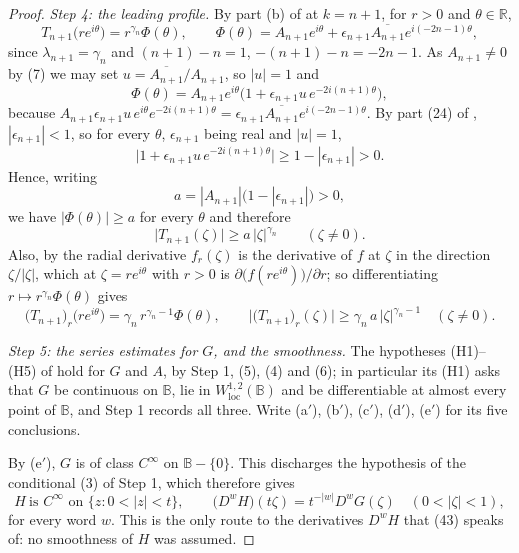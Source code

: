 \begin{proof}
\emph{Step 4: the leading profile.}  By part (b) of
 at $k=n+1$, for $r>0$ and $\theta\in\mathbb{R}$,
\[
  T_{n+1}\bigl(re^{i\theta}\bigr)=r^{\gamma_n}\Phi(\theta),\qquad
  \Phi(\theta)=A_{n+1}e^{i\theta}
    +\epsilon_{n+1}\overline{A_{n+1}}e^{i(-2n-1)\theta},
\]
since $\lambda_{n+1}=\gamma_n$ and $(n+1)-n=1$, $-(n+1)-n=-2n-1$.  As
$A_{n+1}\neq0$ by (7) we may set $u=\overline{A_{n+1}}/A_{n+1}$, so $|u|=1$ and
\[
  \Phi(\theta)=A_{n+1}e^{i\theta}\bigl(1+\epsilon_{n+1}u\,e^{-2i(n+1)\theta}\bigr),
\]
because $A_{n+1}\epsilon_{n+1}u\,e^{i\theta}e^{-2i(n+1)\theta}
=\epsilon_{n+1}\overline{A_{n+1}}e^{i(-2n-1)\theta}$.  By part (24) of
, $|\epsilon_{n+1}|<1$, so for every $\theta$,
$\epsilon_{n+1}$ being real and $|u|=1$,
\[
  \bigl|1+\epsilon_{n+1}u\,e^{-2i(n+1)\theta}\bigr|\ge1-|\epsilon_{n+1}|>0 .
\]
Hence, writing
\begin{equation}\tag{9}
  a=|A_{n+1}|\bigl(1-|\epsilon_{n+1}|\bigr)>0,
\end{equation}
we have $|\Phi(\theta)|\ge a$ for every $\theta$ and therefore
\begin{equation}\tag{10}
  \bigl|T_{n+1}(\zeta)\bigr|\ge a\,|\zeta|^{\gamma_n}\qquad(\zeta\neq0).
\end{equation}
Also, by  the radial derivative $f_r(\zeta)$ is the derivative of
$f$ at $\zeta$ in the direction $\zeta/|\zeta|$, which at $\zeta=re^{i\theta}$
with $r>0$ is $\partial\bigl(f(re^{i\theta})\bigr)/\partial r$; so
differentiating $r\mapsto r^{\gamma_n}\Phi(\theta)$ gives
\begin{equation}\tag{11}
  \bigl(T_{n+1}\bigr)_r\bigl(re^{i\theta}\bigr)
  =\gamma_n\,r^{\gamma_n-1}\Phi(\theta),\qquad
  \bigl|\bigl(T_{n+1}\bigr)_r(\zeta)\bigr|
  \ge\gamma_n\,a\,|\zeta|^{\gamma_n-1}\quad(\zeta\neq0).
\end{equation}

\emph{Step 5: the series estimates for $G$, and the smoothness.}  The
hypotheses (H1)--(H5) of  hold for $G$ and $A$, by
Step 1, (5), (4) and (6); in particular its (H1) asks that $G$ be continuous on
$\mathbb{B}$, lie in $W^{1,2}_{\mathrm{loc}}(\mathbb{B})$ and be
differentiable at almost every point of $\mathbb{B}$, and Step 1 records all
three.  Write (a$'$), (b$'$), (c$'$), (d$'$), (e$'$) for its five conclusions.

By (e$'$), $G$ is of class $C^\infty$ on $\mathbb{B}-\{0\}$.  This discharges
the hypothesis of the conditional (3) of Step 1, which therefore gives
\begin{equation}\tag{11$'$}
  H\ \text{is }C^\infty\text{ on }\{z:0<|z|<t\},\qquad
  \bigl(D^{w}H\bigr)(t\zeta)=t^{-|w|}D^{w}G(\zeta)
  \quad(0<|\zeta|<1),
\end{equation}
for every word $w$.  This is the only route to the derivatives $D^{w}H$ that
(43) speaks of: no smoothness of $H$ was assumed.


\end{proof}
